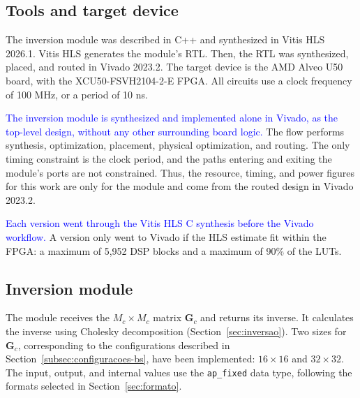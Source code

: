
\subsection{\texorpdfstring{Tools and target device}{Tools and target device}}\label{subsec:hw-ferramentas}
The inversion module was described in C++ and synthesized in Vitis HLS 2026.1. Vitis HLS generates the module's RTL. Then, the RTL was synthesized, placed, and routed in Vivado 2023.2. The target device is the AMD Alveo U50 board, with the XCU50-FSVH2104-2-E FPGA. All circuits use a clock frequency of 100 MHz, or a period of 10 ns.

\textcolor{blue}{The inversion module is synthesized and implemented alone in Vivado, as the top-level design, without any other surrounding board logic.} The flow performs synthesis, optimization, placement, physical optimization, and routing. The only timing constraint is the clock period, and the paths entering and exiting the module's ports are not constrained. Thus, the resource, timing, and power figures for this work are only for the module and come from the routed design in Vivado 2023.2.

\textcolor{blue}{Each version went through the Vitis HLS C synthesis before the Vivado workflow.} A version only went to Vivado if the HLS estimate fit within the FPGA: a maximum of 5,952 DSP blocks and a maximum of 90\% of the LUTs.

\subsection{\texorpdfstring{Inversion module}{Inversion module}}\label{subsec:hw-modulo}
The module receives the $M_c \times M_c$ matrix $\mathbf{G}_c$ and returns its inverse. It calculates the inverse using Cholesky decomposition (Section~\ref{sec:inversao}). Two sizes for $\mathbf{G}_c$, corresponding to the configurations described in Section~\ref{subsec:configuracoes-bs}, have been implemented: $16 \times 16$ and $32 \times 32$. The input, output, and internal values use the \texttt{ap\_fixed} data type, following the formats selected in Section~\ref{sec:formato}.

